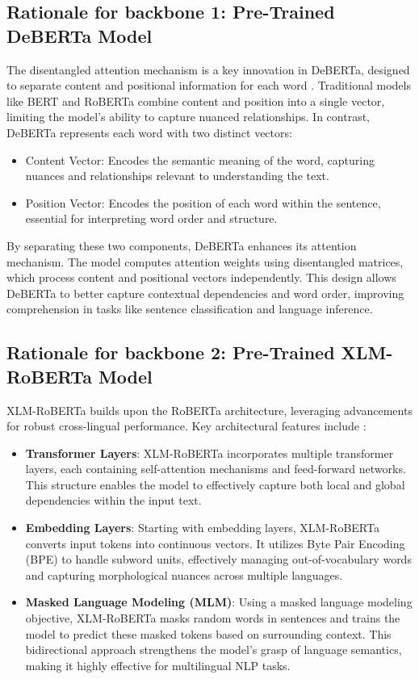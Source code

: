 \documentclass[9pt,a4paper,twoside]{rho-class/rho}
\begin{document}
    \subsection{\textbf{Rationale for backbone 1: Pre-Trained DeBERTa Model}}

        The disentangled attention mechanism is a key innovation in DeBERTa, designed to separate content and positional information for each word \cite{he2020deberta}. Traditional models like BERT and RoBERTa combine content and position into a single vector, limiting the model’s ability to capture nuanced relationships. In contrast, DeBERTa represents each word with two distinct vectors:

\begin{itemize}
    \item Content Vector: Encodes the semantic meaning of the word, capturing nuances and relationships relevant to understanding the text.
    \item Position Vector: Encodes the position of each word within the sentence, essential for interpreting word order and structure.
\end{itemize}
By separating these two components, DeBERTa enhances its attention mechanism. The model computes attention weights using disentangled matrices, which process content and positional vectors independently. This design allows DeBERTa to better capture contextual dependencies and word order, improving comprehension in tasks like sentence classification and language inference.


    \subsection{\textbf{Rationale for backbone 2: Pre-Trained XLM-RoBERTa Model}}

        XLM-RoBERTa builds upon the RoBERTa architecture, leveraging advancements for robust cross-lingual performance. Key architectural features include \cite{li2021cross}:

\begin{itemize}
    \item \textbf{Transformer Layers}: XLM-RoBERTa incorporates multiple transformer layers, each containing self-attention mechanisms and feed-forward networks. This structure enables the model to effectively capture both local and global dependencies within the input text.
    \item \textbf{Embedding Layers}: Starting with embedding layers, XLM-RoBERTa converts input tokens into continuous vectors. It utilizes Byte Pair Encoding (BPE) to handle subword units, effectively managing out-of-vocabulary words and capturing morphological nuances across multiple languages.
    \item \textbf{Masked Language Modeling (MLM)}: Using a masked language modeling objective, XLM-RoBERTa masks random words in sentences and trains the model to predict these masked tokens based on surrounding context. This bidirectional approach strengthens the model's grasp of language semantics, making it highly effective for multilingual NLP tasks.
\end{itemize}
\end{document}
